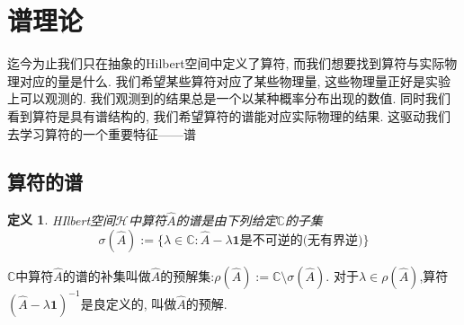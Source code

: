 \documentclass[a4paper,11pt]{book}
\newtheorem{definition}{\hspace{2em}定义}[section]
\begin{document}
\section{谱理论}
迄今为止我们只在抽象的Hilbert空间中定义了算符, 而我们想要找到算符与实际物理对应的量是什么. 我们希望某些算符对应了某些物理量, 这些物理量正好是实验上可以观测的. 我们观测到的结果总是一个以某种概率分布出现的数值. 同时我们看到算符是具有谱结构的, 我们希望算符的谱能对应实际物理的结果. 这驱动我们去学习算符的一个重要特征------谱
\subsection{算符的谱}
\begin{definition}
  HIlbert空间$\mathcal{H}$中算符$\hat{A}$的谱是由下列给定$\mathbb{C}$的子集
  \begin{equation*}
    \sigma(\hat{A}):=\{\lambda\in\mathbb{C}:\hat{A}-\lambda\mathbf{1}\text{是不可逆的(无有界逆)}\}
  \end{equation*}
\end{definition}
$\mathbb{C}$中算符$\hat{A}$的谱的补集叫做$\hat{A}$的预解集:$\rho(\hat{A}):=\mathbb{C}\setminus\sigma(\hat{A})$. 对于$\lambda\in\rho(\hat{A})$,算符$(\hat{A}-\lambda\mathbf{1})^{-1}$是良定义的, 叫做$\hat{A}$的预解.
\end{document}

